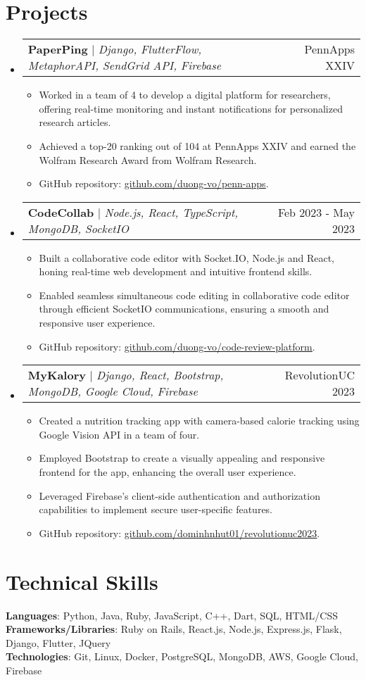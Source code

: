 \documentclass[letterpaper,11pt]{article}
\makeatletter
\newcommand{\resumeItem}[1]{
  \item\small{
    {#1 \vspace{-2pt}}
  }
}
\newcommand{\resumeProjectHeading}[2]{
    \item
    \begin{tabular*}{0.97\textwidth}{l@{\extracolsep{\fill}}r}
      \small#1 & #2 \\
    \end{tabular*}\vspace{-7pt}
}
\newcommand{\resumeSubHeadingListStart}{\begin{itemize}[leftmargin=0.15in, label={}]}
\newcommand{\resumeSubHeadingListEnd}{\end{itemize}}
\newcommand{\resumeItemListStart}{\begin{itemize}}
\newcommand{\resumeItemListEnd}{\end{itemize}\vspace{-5pt}}
\makeatother
\begin{document}
\section{Projects}
    \resumeSubHeadingListStart
      \resumeProjectHeading
          {\textbf{PaperPing} $|$ \emph{Django, FlutterFlow, MetaphorAPI, SendGrid API, Firebase}} {PennApps XXIV}
          \resumeItemListStart
            \resumeItem{Worked in a team of 4 to develop a digital platform for researchers, offering real-time monitoring and instant notifications for personalized research articles.}
            \resumeItem{Achieved a top-20 ranking out of 104 at PennApps XXIV and earned the Wolfram Research Award from Wolfram Research.}
            \resumeItem{GitHub repository: \href{https://github.com/duong-vo/penn-apps}{\underline{github.com/duong-vo/penn-apps}}.}
          \resumeItemListEnd
      \resumeProjectHeading
          {\textbf{CodeCollab} $|$ \emph{Node.js, React, TypeScript, MongoDB, SocketIO}}{Feb 2023 - May 2023}
          \resumeItemListStart
            \resumeItem{Built a collaborative code editor with Socket.IO, Node.js and React, honing real-time web development and intuitive frontend skills.}
            \resumeItem{Enabled seamless simultaneous code editing in collaborative code editor through efficient SocketIO communications, ensuring a smooth and responsive user experience.}
            \resumeItem{GitHub repository: \href{https://github.com/duong-vo/code-review-platform}{\underline{github.com/duong-vo/code-review-platform}}.}
          \resumeItemListEnd
      \resumeProjectHeading
          {\textbf{MyKalory} $|$ \emph{Django, React, Bootstrap, MongoDB, Google Cloud, Firebase}}{RevolutionUC 2023}
          \resumeItemListStart
            \resumeItem{Created a nutrition tracking app with camera-based calorie tracking using Google Vision API in a team of four.}
            \resumeItem{Employed Bootstrap to create a visually appealing and responsive frontend for the app, enhancing the overall user experience.}
            \resumeItem{Leveraged Firebase's client-side authentication and authorization capabilities to implement secure user-specific features.}
            \resumeItem{GitHub repository: \href{https://github.com/dominhnhut01/revolutionuc2023}{\underline{github.com/dominhnhut01/revolutionuc2023}}.}
          \resumeItemListEnd
    \resumeSubHeadingListEnd

%
\section{Technical Skills}
 \begin{itemize}[leftmargin=0.15in, label={}]
    \small{\item{
     \textbf{Languages}{: Python, Java, Ruby, JavaScript, C++, Dart, SQL, HTML/CSS} \\
     \textbf{Frameworks/Libraries}{: Ruby on Rails, React.js, Node.js, Express.js, Flask, Django, Flutter, JQuery} \\
     \textbf{Technologies}{: Git, Linux, Docker, PostgreSQL, MongoDB, AWS, Google Cloud, Firebase} \\
    }}
 \end{itemize}

\end{document}
